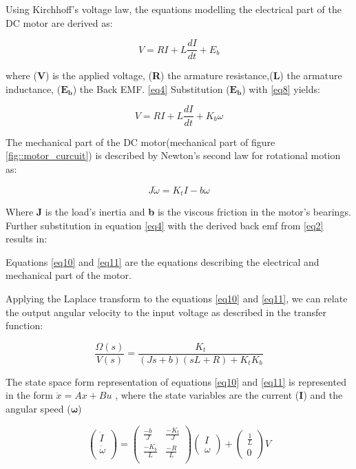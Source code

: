 Using Kirchhoff's voltage law, the equations modelling the electrical part of the DC motor are derived as:

\begin{equation} \label{eq10}
V = RI + L\frac{dI}{dt} + E_b
\end{equation} 

where (\textbf{V}) is the applied voltage, (\textbf{R}) the armature resistance,(\textbf{L}) the armature inductance, ($\boldsymbol{E_b}$) the Back EMF. \ref{eq4}
Substitution ($\boldsymbol{E_b}$) with \ref{eq8} yields:

\begin{equation} \label{eq11}
V = RI + L\frac{dI}{dt} + K_b\omega
\end{equation}

The mechanical part of the DC motor(mechanical part of figure \ref{fig::motor_curcuit}) is described by Newton's second law for rotational motion as:

\begin{equation} \label{eq12}
J\dot{\omega} = K_tI - b\omega
\end{equation}

Where \textbf{J} is the load's inertia and \textbf{b} is the viscous friction in the motor's bearings.
Further substitution in equation \ref{eq4} with the derived back emf from \ref{eq2} results in:

Equations \ref{eq10} and \ref{eq11} are the equations describing the electrical and mechanical part of the motor.

Applying the Laplace transform to the equations \ref{eq10} and \ref{eq11}, we can relate the output angular velocity to the input voltage as described in the transfer function:

\begin{equation} \label{eq13}
\frac{\Omega(s)}{V(s)} = \frac{K_t}{(Js + b)(sL + R) + K_tK_b}
\end{equation}

The state space form representation of equations \ref{eq10} and \ref{eq11} is represented in the form $\dot{x} = Ax + Bu$ , where the state variables are the current (\textbf{I}) and the angular speed ($\boldsymbol{\omega}$)

\begin{equation} \label{eq14} 
\begin{pmatrix}
	\dot{I} \\
	\dot{\omega} \\
\end{pmatrix} 
=
\begin{pmatrix} 
	\frac{-b}{J}   & \frac{-K_t}{J} \\
	\frac{-K_b}{L} & \frac{-R}{L} \\ 
\end{pmatrix}
\begin{pmatrix}
	I \\
	\omega
\end{pmatrix}
+
\begin{pmatrix}
	\frac{1}{L} \\
	0
\end{pmatrix}
V	
\end{equation}


